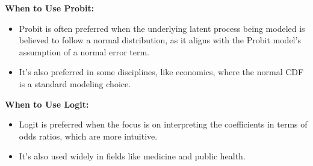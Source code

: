 \documentclass{article}
\begin{document}
\textbf{When to Use Probit:}
\begin{itemize}
  \item Probit is often preferred when the underlying latent process being modeled is believed to follow a normal distribution, as it aligns with the Probit model's assumption of a normal error term.
  \item It's also preferred in some disciplines, like economics, where the normal CDF is a standard modeling choice.
\end{itemize}

\textbf{When to Use Logit:}
\begin{itemize}
  \item Logit is preferred when the focus is on interpreting the coefficients in terms of odds ratios, which are more intuitive.
  \item It's also used widely in fields like medicine and public health.
\end{itemize}
\end{document}
